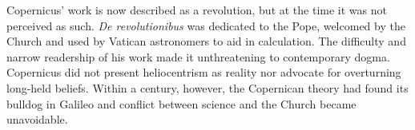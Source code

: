 % 


Copernicus' work is now described as a revolution, but at the time it was not perceived as such. \emph{De revolutionibus} was dedicated to the Pope, welcomed by the Church and used by Vatican astronomers to aid in calculation. The difficulty and narrow readership of his work made it unthreatening to contemporary dogma. Copernicus did not present heliocentrism as reality nor advocate for overturning long-held beliefs. Within a century, however, the Copernican theory had found its bulldog in Galileo and conflict between science and the Church became unavoidable.\goodbreak



% 

